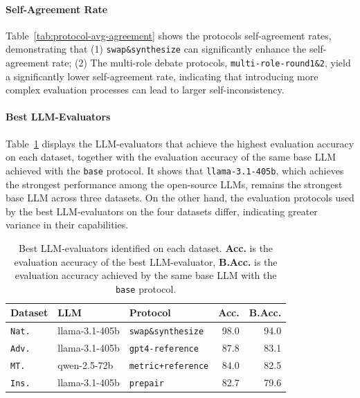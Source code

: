 \documentclass[11pt]{article}
\newcommand{\natshort}{\texttt{Nat.}\xspace}
\newcommand{\advshort}{\texttt{Adv.}\xspace}
\newcommand{\mtshort}{\texttt{MT.}\xspace}
\newcommand{\insshort}{\texttt{Ins.}\xspace}
\begin{document}
\renewcommand{\arraystretch}{1.1} 

\paragraph{Self-Agreement Rate} Table~\ref{tab:protocol-avg-agreement} shows the protocols self-agreement rates, demonstrating that
(1) \texttt{swap\&synthesize} can significantly enhance the self-agreement rate;
(2) The multi-role debate protocols, \texttt{multi-role-round1\&2}, yield a significantly lower self-agreement rate, indicating that introducing more complex evaluation processes can lead to larger self-inconsistency.


\paragraph{Best LLM-Evaluators}

Table~\ref{tab:best-evaluator} displays the LLM-evaluators that achieve the highest evaluation accuracy on each dataset, together with the evaluation accuracy of the same base LLM achieved with the \texttt{base} protocol.
It shows that \texttt{llama-3.1-405b}, which achieves the strongest performance among the open-source LLMs, remains the strongest base LLM across three datasets.
On the other hand, the evaluation protocols used by the best LLM-evaluators on the four datasets differ, indicating greater variance in their capabilities. 
% 





\begin{table}[t!]
\small
\centering
\addtolength{\tabcolsep}{-4.0pt} 
\begin{tabular}{lllrr}
\toprule
\textbf{Dataset} & \textbf{LLM} & \textbf{Protocol} & \textbf{Acc.}  & \textbf{B.Acc.}\\
\midrule
 \natshort & llama-3.1-405b & \texttt{swap\&synthesize} & 98.0 & 94.0 \\
 \advshort & llama-3.1-405b  & \texttt{gpt4-reference} & 87.8 & 83.1 \\
 \mtshort & qwen-2.5-72b & \texttt{metric+reference} & 84.0  & 82.5 \\
 \insshort & llama-3.1-405b & \texttt{prepair} &  82.7 & 79.6 \\
\bottomrule
\end{tabular}
\addtolength{\tabcolsep}{+4.0pt} 
\caption{Best LLM-evaluators identified on each dataset.
\textbf{Acc.} is the evaluation accuracy of the best LLM-evaluator, \textbf{B.Acc.} is the evaluation accuracy achieved by the same base LLM with the \texttt{base} protocol. 
% 
}
\label{tab:best-evaluator} 
\end{table}
\end{document}
